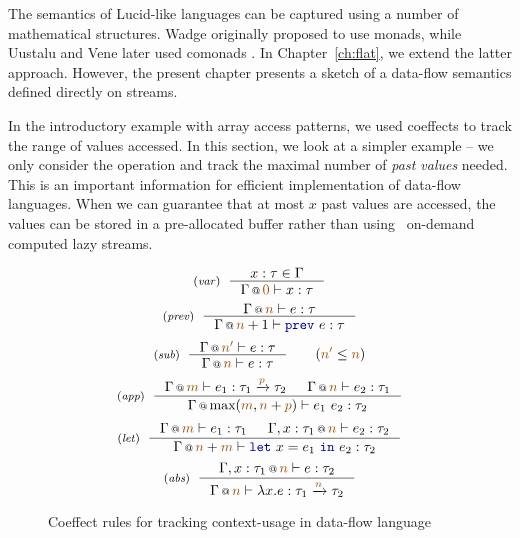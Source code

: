 The semantics of Lucid-like languages can be captured using a number of mathematical 
structures. Wadge \cite{app-lucid-monads} originally proposed to use monads, while Uustalu and 
Vene later used comonads \cite{app-dataflow-essence}. In Chapter~\ref{ch:flat}, we extend
the latter approach. However, the present chapter presents a sketch of a data-flow semantics
defined directly on streams.

In the introductory example with array access patterns, we used coeffects to track the range
of values accessed. In this section, we look at a simpler example -- we only consider the
 operation and track the maximal number of \emph{past values} needed. This is an 
important information for efficient implementation of data-flow languages. When we can guarantee
that at most $x$ past values are accessed, the values can be stored in a pre-allocated buffer
rather than using \eg~on-demand computed lazy streams.



\begin{figure}[t]
\begin{equation*}
\tyrule{var}
  {x : \tau \in \Gamma}
  {\coctx{\Gamma}{\aclrd{ 0 }} \vdash x : \tau }
\end{equation*}
\begin{equation*}
\tyrule{prev}
  {\coctx{\Gamma}{ \aclrd{n} } \vdash e : \tau}
  {\coctx{\Gamma}{ \aclrd{n}+1} \vdash \kvd{prev}~e : \tau}
\end{equation*}
\begin{equation*}
\tyrule{sub}
  {\coctx{\Gamma}{\aclrd{n'}} \vdash e : \tau }
  {\coctx{\Gamma}{\aclrd{n}} \vdash e : \tau }\quad\quad(\aclrd{n'} \leq \aclrd{n})
\end{equation*}
\begin{equation*}
\tyrule{app}
  {\coctx{\Gamma}{\aclrd{m}} \vdash e_1 : \tau_1 \xrightarrow{\aclrd{p}} \tau_2 &
   \coctx{\Gamma}{\aclrd{n}} \vdash e_2 : \tau_1 }
  {\coctx{\Gamma}{\textnormal{max}(\aclrd{m}, \aclrd{n} + \aclrd{p})} \vdash e_1~e_2 : \tau_2}
\end{equation*}
\begin{equation*}
\tyrule{let}
  { \coctx{\Gamma}{\aclrd{m}} \vdash e_1 : \tau_1 &
    \coctx{\Gamma, x:\tau_1}{\aclrd{n}} \vdash e_2 : \tau_2}
  {\coctx{\Gamma}{\aclrd{n}+\aclrd{m}} \vdash \kvd{let}~x=e_1~\kvd{in}~e_2 : \tau_2 }
\end{equation*}
\begin{equation*}
\tyrule{abs}
  {\coctx{\Gamma, x:\tau_1}{\aclrd{n}} \vdash e : \tau_2}
  {\coctx{\Gamma}{\aclrd{n}} \vdash \lambda x.e : \tau_1 \xrightarrow{\aclrd{n}} \tau_2 }
\end{equation*}

\caption{Coeffect rules for tracking context-usage in data-flow language}
\label{fig:applications-flat-dataflow}
\end{figure}

